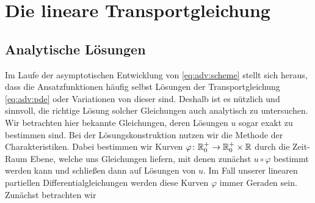 \section{Die lineare Transportgleichung}
\subsection{Analytische Lösungen}
\label{appendix:loesungen}
Im Laufe der asymptotischen Entwicklung von \eqref{eq:adv:scheme} stellt sich heraus, dass die Ansatzfunktionen häufig selbst Lösungen der Transportgleichung \eqref{eq:adv:pde} oder Variationen von dieser sind.
Deshalb ist es nützlich und sinnvoll, die richtige Lösung solcher Gleichungen auch analytisch zu untersuchen.
Wir betrachten hier bekannte Gleichungen, deren Lösungen $u$ sogar exakt zu bestimmen sind.
Bei der Lösungskonstruktion nutzen wir die Methode der Charakteristiken.
Dabei bestimmen wir Kurven $\varphi\colon \mathbb R^+_0 \to \mathbb R^+_0 \times \mathbb R$ durch die Zeit-Raum Ebene, welche uns Gleichungen liefern, mit denen zunächst $u \circ \varphi$ bestimmt werden kann und schließen dann auf Lösungen von $u$.
Im Fall unserer linearen partiellen Differentialgleichungen werden diese Kurven $\varphi$ immer Geraden sein.
Zunächst betrachten wir

